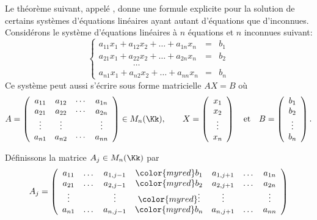 \documentclass[class=report,crop=false]{standalone}
\begin{document}
Le théorème suivant, appelé , donne une formule explicite pour la
solution de certains systèmes d'équations linéaires ayant autant d'équations que d'inconnues.
Considérons le système d'équations linéaires à $n$ équations et $n$ inconnues suivant:
\[
\left\{
\begin{array}{ccc}
a_{11} x_1 + a_{12} x_2 + \dots + a_{1n} x_{n} & = & b_1\\
a_{21} x_1 + a_{22} x_2 + \dots + a_{2n} x_n & = & b_2\\
\qquad\qquad \dots \qquad\qquad &  &\\
a_{n1} x_1 + a_{n2} x_2 + \dots + a_{nn} x_n & = & b_n
\end{array}
\right.
\]
Ce système peut aussi s'écrire sous forme matricielle $AX=B$ où
$$
A = \left(
\begin{array}{cccc}
a_{11} & a_{12} & \cdots & a_{1n}\\
a_{21} & a_{22} & \cdots & a_{2n}\\
\vdots & \vdots && \vdots\\
a_{n1} & a_{n2}& \cdots &a_{nn}
\end{array}\right) \in M_{n}(\Kk), \qquad X= \left( \begin{array}{c}x_1\\x_2 \\\vdots \\x_n \end{array} \right) \quad \mbox{et} \quad B=\left( \begin{array}{c}b_1\\b_2 \\\vdots \\b_n \end{array} \right).
$$


Définissons la matrice $A_j \in M_{n}(\Kk)$ par
$$
A_j = \left(
\begin{array}{ccccccc}
a_{11} &  \dots & a_{1,j-1} & {\color{myred}b_1} & a_{1,j+1} & \dots & a_{1n}\\
a_{21} & \dots & a_{2,j-1}& {\color{myred}b_2} & a_{2,j+1}& \dots & a_{2n}\\
\vdots &  & \vdots & {\color{myred}\vdots} & \vdots& &\vdots\\
a_{n1} &\dots & a_{n,j-1}& {\color{myred}b_n}& a_{n,j+1}& \dots & a_{nn}
\end{array}\right)
$$
\end{document}
